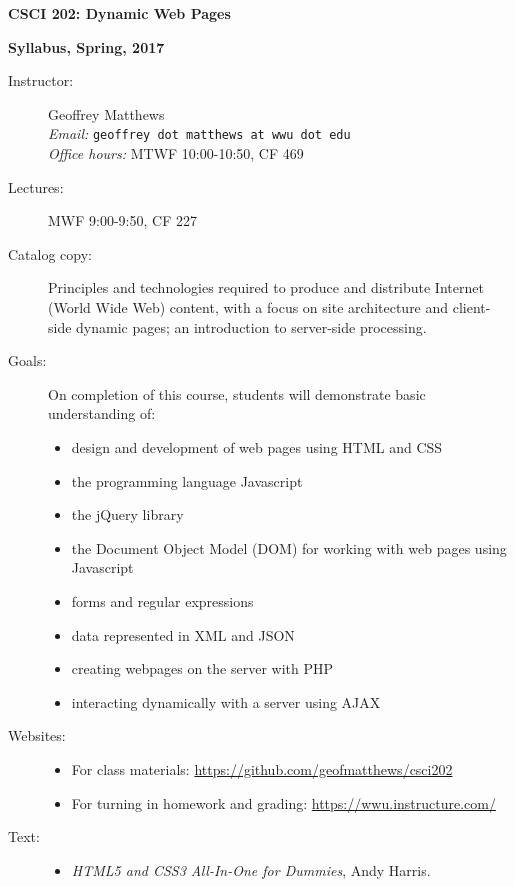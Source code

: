 \documentclass{article}
\begin{document}
\centerline{\Large\bf CSCI 202: Dynamic Web Pages}
\centerline{\large\bf Syllabus, Spring, 2017}


\begin{description}


\item[Instructor:] Geoffrey Matthews\\
{\em Email:} {\tt geoffrey dot matthews at wwu dot edu}\\
{\em Office hours:} MTWF 10:00-10:50, CF 469


\item[Lectures:] MWF 9:00-9:50, CF 227


\item[Catalog copy:] Principles and technologies required to produce
  and distribute Internet (World Wide Web) content, with a focus on
  site architecture and client-side dynamic pages; an introduction to
  server-side processing. 


\item[Goals:]  On completion of this course, students will demonstrate
  basic understanding of:
\begin{itemize}
\item design and development of web pages using HTML and CSS
\item the programming language Javascript
\item the jQuery library
\item the Document Object Model (DOM) for working with web pages using
  Javascript
\item forms and regular expressions
\item data represented in XML and JSON
\item creating webpages on the server with PHP
\item interacting dynamically with a server using AJAX
\end{itemize}


\item[Websites:]\mbox{}
\begin{itemize}
  \item For class materials:
    \url{https://github.com/geofmatthews/csci202} 
  \item For turning in homework and grading:
    \url{https://wwu.instructure.com/}  
\end{itemize}

\item[Text:]\mbox{}
  
  \begin{itemize}
  \item {\em HTML5 and CSS3 All-In-One for Dummies}, Andy Harris.


\end{itemize}
\end{description}
\end{document}
